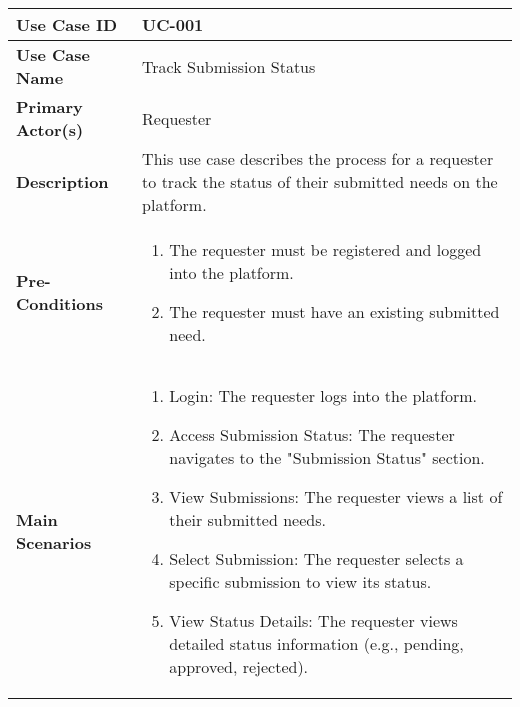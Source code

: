 \begin{table}[!ht]
    \centering
    \renewcommand{\arraystretch}{1.3} %
    \begin{tabularx}{\textwidth}{|l|X|}
        \hline
        \textbf{Use Case ID} & UC-001 \\
        \hline
        \textbf{Use Case Name} & Track Submission Status \\
        \hline
        \textbf{Primary Actor(s)} & Requester \\
        \hline
        \textbf{Description} &  This use case describes the process for a requester to track the status of their submitted needs on the platform.\\
        \hline
        \textbf{Pre-Conditions} & 
        \begin{enumerate}[label=\arabic*.,itemsep=0pt]
            \item The requester must be registered and logged into the platform.
            \item The requester must have an existing submitted need.
        \end{enumerate} \\
        \hline
        \textbf{Main Scenarios} & 
        \begin{enumerate}[label=\arabic*.,itemsep=0pt]
            \item Login: The requester logs into the platform.
            \item Access Submission Status: The requester navigates to the "Submission Status" section.
            \item View Submissions: The requester views a list of their submitted needs.
            \item Select Submission: The requester selects a specific submission to view its status.
            \item View Status Details: The requester views detailed status information (e.g., pending, approved, rejected).
        \end{enumerate} \\
        

\end{tabularx}
\end{table}
